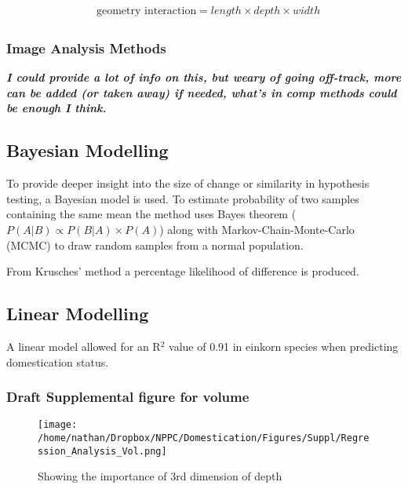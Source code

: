 \documentclass[a4paper, twocolumn]{article}
\begin{document}
 \begin{align}
\label{eq:org82e35bb}
   &\begin{aligned}
\text{geometry interaction} = length \times depth \times width
   \end{aligned}
 \end{align}

\subsubsection{Image Analysis Methods}
\label{sec:orgc4a97b1}
\textbf{\emph{I could provide a lot of info on this, but weary of going off-track, more can be added (or taken away) if needed, what's in comp methods could be enough I think.}}

\subsection{Bayesian Modelling}
\label{sec:org7ccd31c}
To provide deeper insight into the size of change or similarity in hypothesis testing, a Bayesian model is used. To estimate probability of two samples containing the same mean the method uses Bayes theorem (\(P(A|B) \propto P(B|A) \times P(A)\)) \cite{Kruschke2012} along with Markov-Chain-Monte-Carlo (MCMC) to draw random samples from a normal population.

From Krusches' method a percentage likelihood of difference is produced.

\subsection{Linear Modelling}
\label{sec:orgc786e53}

A linear model allowed for an R\(^{\text{2}}\) value of 0.91 in einkorn species when predicting domestication status.

\subsubsection{Draft Supplemental figure for volume}
\label{sec:org26b3f81}
\begin{figure}[htbp]
\centering
\texttt{[image: /home/nathan/Dropbox/NPPC/Domestication/Figures/Suppl/Regression\_Analysis\_Vol.png]}
\caption{\label{fig:orga51c863}
Showing the importance of 3rd dimension of depth}
\end{figure}
\end{document}
